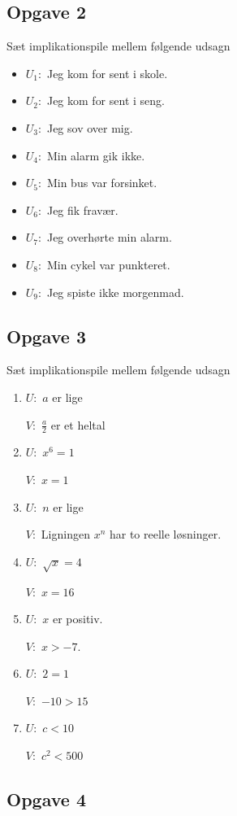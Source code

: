 \subsection*{Opgave 2}
Sæt implikationspile mellem følgende udsagn
\begin{itemize}
	\item[$\cdot$] $U_1:$ Jeg kom for sent i skole.
	\item[$\cdot$] $U_2:$ Jeg kom for sent i seng.
	\item[$\cdot$] $U_3:$ Jeg sov over mig.
	\item[$\cdot$] $U_4:$ Min alarm gik ikke.
	\item[$\cdot$] $U_5:$ Min bus var forsinket.
	\item[$\cdot$] $U_6:$ Jeg fik fravær.
	\item[$\cdot$] $U_7:$ Jeg overhørte min alarm.
	\item[$\cdot$] $U_8:$ Min cykel var punkteret.
	\item[$\cdot$] $U_9:$ Jeg spiste ikke morgenmad.
\end{itemize}

\subsection*{Opgave 3}
Sæt implikationspile mellem følgende udsagn
\begin{enumerate}[label=\roman*)]
	\item $U:$ $a$ er lige
	
	$V:$ $\frac{a}{2}$ er et heltal
	\item $U:$ $x^6 = 1$
	
	$V:$ $x = 1$
	\item $U:$ $n$ er lige
	
	$V:$ Ligningen $x^n$ har to reelle løsninger. 
	\item $U:$ $\sqrt{x} = 4$
	
	$V:$ $x = 16$
	\item $U:$ $x$ er positiv.
	
	$V:$ $x > -7$.
	\item $U:$ $2 = 1$
	
	$V:$ $-10 > 15$
	\item $U:$ $c < 10$ 
	
	$V:$ $c^2 < 500$
\end{enumerate}

\subsection*{Opgave 4}

